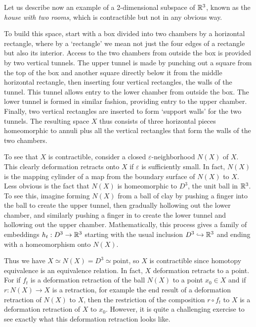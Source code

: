 \begin{example}
\label{ex:house-with-two-rooms-contractible}
Let us describe now an example of a 2-dimensional subspace of $\mathbb{R}^3$, known as
the \textit{house with two rooms}, which is contractible but not in any obvious way.



To build this space, start with a box divided into two chambers by a horizontal
rectangle, where by a `rectangle' we mean not just the four edges of a rectangle but
also its interior. Access to the two chambers from outside the box is provided by two
vertical tunnels. The upper tunnel is made by punching out a square from the top of the
box and another square directly below it from the middle horizontal rectangle, then
inserting four vertical rectangles, the walls of the tunnel. This tunnel allows entry to
the lower chamber from outside the box. The lower tunnel is formed in similar fashion,
providing entry to the upper chamber. Finally, two vertical rectangles are inserted to
form `support walls' for the two tunnels. The resulting space $X$ thus consists of three
horizontal pieces homeomorphic to annuli plus all the vertical rectangles that form the
walls of the two chambers.

To see that $X$ is contractible, consider a closed $\varepsilon$-neighborhood $N(X)$ of $X$.
This clearly deformation retracts onto $X$ if $\varepsilon$ is sufficiently small. In fact, $N(X)$
is the mapping cylinder of a map from the boundary surface of $N(X)$ to $X$. Less
obvious is the fact that $N(X)$ is homeomorphic to $D^3$, the unit ball in $\mathbb{R}^3$. To see
this, imagine forming $N(X)$ from a ball of clay by pushing a finger into the ball to
create the upper tunnel, then gradually hollowing out the lower chamber, and similarly
pushing a finger in to create the lower tunnel and hollowing out the upper chamber.
Mathematically, this process gives a family of embeddings $h_t : D^3 \to \mathbb{R}^3$ starting with
the usual inclusion $D^3 \hookrightarrow \mathbb{R}^3$ and ending with a homeomorphism onto $N(X)$.

Thus we have $X \simeq N(X) = D^3 \simeq \text{point}$, so $X$ is contractible since homotopy
equivalence is an equivalence relation. In fact, $X$ deformation retracts to a point. For
if $f_t$ is a deformation retraction of the ball $N(X)$ to a point $x_0 \in X$ and if
$r : N(X) \to X$ is a retraction, for example the end result of a deformation retraction
of $N(X)$ to $X$, then the restriction of the composition $r \circ f_t$ to $X$ is a deformation
retraction of $X$ to $x_0$. However, it is quite a challenging exercise to see exactly what
this deformation retraction looks like.
\end{example}

